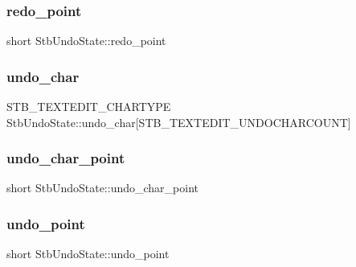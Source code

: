 \hypertarget{struct_stb_undo_state_a719ba014b2db8a8ea55739664b445af0}{}\label{struct_stb_undo_state_a719ba014b2db8a8ea55739664b445af0} 
\subsubsection{\texorpdfstring{redo\+\_\+point}{redo\_point}}
{\footnotesize\ttfamily short Stb\+Undo\+State\+::redo\+\_\+point}

\hypertarget{struct_stb_undo_state_a88320a054aaf18ca122c2b23903a8677}{}\label{struct_stb_undo_state_a88320a054aaf18ca122c2b23903a8677} 
\subsubsection{\texorpdfstring{undo\+\_\+char}{undo\_char}}
{\footnotesize\ttfamily S\+T\+B\+\_\+\+T\+E\+X\+T\+E\+D\+I\+T\+\_\+\+C\+H\+A\+R\+T\+Y\+PE Stb\+Undo\+State\+::undo\+\_\+char\mbox{[}S\+T\+B\+\_\+\+T\+E\+X\+T\+E\+D\+I\+T\+\_\+\+U\+N\+D\+O\+C\+H\+A\+R\+C\+O\+U\+NT\mbox{]}}

\hypertarget{struct_stb_undo_state_ad5c08b1f8c24678c44407f0ca805afcf}{}\label{struct_stb_undo_state_ad5c08b1f8c24678c44407f0ca805afcf} 
\subsubsection{\texorpdfstring{undo\+\_\+char\+\_\+point}{undo\_char\_point}}
{\footnotesize\ttfamily short Stb\+Undo\+State\+::undo\+\_\+char\+\_\+point}

\hypertarget{struct_stb_undo_state_ad29a8695b3e8252ac164d0c2d0be7d7c}{}\label{struct_stb_undo_state_ad29a8695b3e8252ac164d0c2d0be7d7c} 
\subsubsection{\texorpdfstring{undo\+\_\+point}{undo\_point}}
{\footnotesize\ttfamily short Stb\+Undo\+State\+::undo\+\_\+point}


